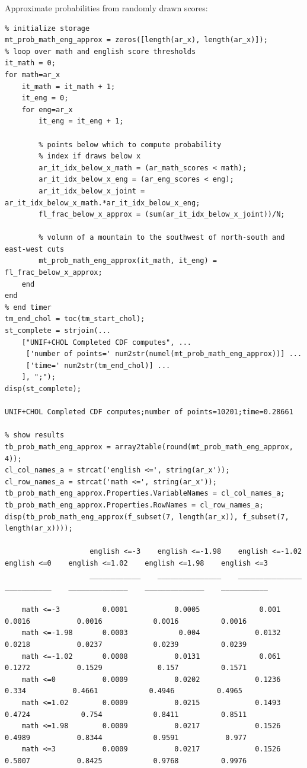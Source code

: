 \documentclass[
]{book}
\begin{document}
Approximate probabilities from randomly drawn scores:

\begin{verbatim}
% initialize storage
mt_prob_math_eng_approx = zeros([length(ar_x), length(ar_x)]);
% loop over math and english score thresholds
it_math = 0;
for math=ar_x
    it_math = it_math + 1;
    it_eng = 0;
    for eng=ar_x
        it_eng = it_eng + 1;
        
        % points below which to compute probability 
        % index if draws below x
        ar_it_idx_below_x_math = (ar_math_scores < math);
        ar_it_idx_below_x_eng = (ar_eng_scores < eng);
        ar_it_idx_below_x_joint = ar_it_idx_below_x_math.*ar_it_idx_below_x_eng;
        fl_frac_below_x_approx = (sum(ar_it_idx_below_x_joint))/N;
        
        % volumn of a mountain to the southwest of north-south and east-west cuts
        mt_prob_math_eng_approx(it_math, it_eng) = fl_frac_below_x_approx;
    end
end
% end timer
tm_end_chol = toc(tm_start_chol);
st_complete = strjoin(...
    ["UNIF+CHOL Completed CDF computes", ...
     ['number of points=' num2str(numel(mt_prob_math_eng_approx))] ...
     ['time=' num2str(tm_end_chol)] ...
    ], ";");
disp(st_complete);

UNIF+CHOL Completed CDF computes;number of points=10201;time=0.28661

% show results
tb_prob_math_eng_approx = array2table(round(mt_prob_math_eng_approx, 4));
cl_col_names_a = strcat('english <=', string(ar_x'));
cl_row_names_a = strcat('math <=', string(ar_x'));
tb_prob_math_eng_approx.Properties.VariableNames = cl_col_names_a;
tb_prob_math_eng_approx.Properties.RowNames = cl_row_names_a;
disp(tb_prob_math_eng_approx(f_subset(7, length(ar_x)), f_subset(7, length(ar_x))));

                    english <=-3    english <=-1.98    english <=-1.02    english <=0    english <=1.02    english <=1.98    english <=3
                    ____________    _______________    _______________    ___________    ______________    ______________    ___________

    math <=-3          0.0001           0.0005              0.001           0.0016           0.0016            0.0016          0.0016   
    math <=-1.98       0.0003            0.004             0.0132           0.0218           0.0237            0.0239          0.0239   
    math <=-1.02       0.0008           0.0131              0.061           0.1272           0.1529             0.157          0.1571   
    math <=0           0.0009           0.0202             0.1236            0.334           0.4661            0.4946          0.4965   
    math <=1.02        0.0009           0.0215             0.1493           0.4724            0.754            0.8411          0.8511   
    math <=1.98        0.0009           0.0217             0.1526           0.4989           0.8344            0.9591           0.977   
    math <=3           0.0009           0.0217             0.1526           0.5007           0.8425            0.9768          0.9976   
\end{verbatim}
\end{document}
